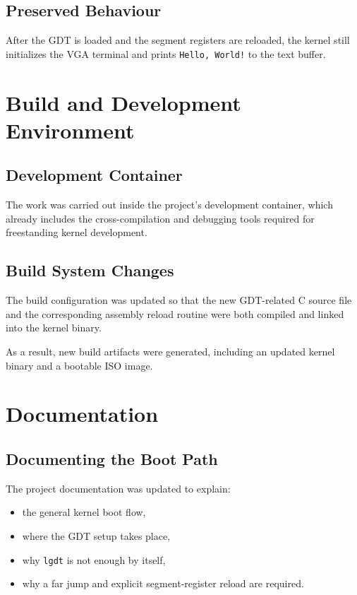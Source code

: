 \subsection{Preserved Behaviour}
After the GDT is loaded and the segment registers are reloaded, the kernel still initializes the VGA terminal and prints \texttt{Hello, World!} to the text buffer.

\section{Build and Development Environment}

\subsection{Development Container}
The work was carried out inside the project's development container, which already includes the cross-compilation and debugging tools required for freestanding kernel development.

\subsection{Build System Changes}
The build configuration was updated so that the new GDT-related C source file and the corresponding assembly reload routine were both compiled and linked into the kernel binary.

As a result, new build artifacts were generated, including an updated kernel binary and a bootable ISO image.

\section{Documentation}

\subsection{Documenting the Boot Path}
The project documentation was updated to explain:
\begin{itemize}
  \item the general kernel boot flow,
  \item where the GDT setup takes place,
  \item why \texttt{lgdt} is not enough by itself,
  \item why a far jump and explicit segment-register reload are required.
\end{itemize}

